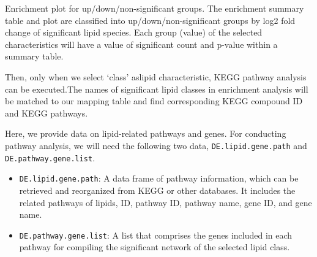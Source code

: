 \documentclass[]{article}
\providecommand{\tightlist}{%
  \setlength{\itemsep}{0pt}\setlength{\parskip}{0pt}}
\begin{document}
\label{fig:unnamed-chunk-33}Enrichment plot for up/down/non-significant groups. The enrichment summary table and plot are classified into up/down/non-significant groups by log2 fold change of significant lipid species. Each group (value) of the selected characteristics will have a value of significant count and p-value within a summary table.

Then, only when we select `class' aslipid characteristic, KEGG pathway analysis can be executed.The names of significant lipid classes in enrichment analysis will be matched to our mapping table and find corresponding KEGG compound ID and KEGG pathways.

Here, we provide data on lipid-related pathways and genes. For conducting pathway analysis, we will need the following two data, \texttt{DE.lipid.gene.path} and \texttt{DE.pathway.gene.list}.

\begin{itemize}
\tightlist
\item
  \texttt{DE.lipid.gene.path}: A data frame of pathway information, which can be retrieved and reorganized from KEGG or other databases. It includes the related pathways of lipids, ID, pathway ID, pathway name, gene ID, and gene name.
\item
  \texttt{DE.pathway.gene.list}: A list that comprises the genes included in each pathway for compiling the significant network of the selected lipid class.
\end{itemize}
\end{document}
